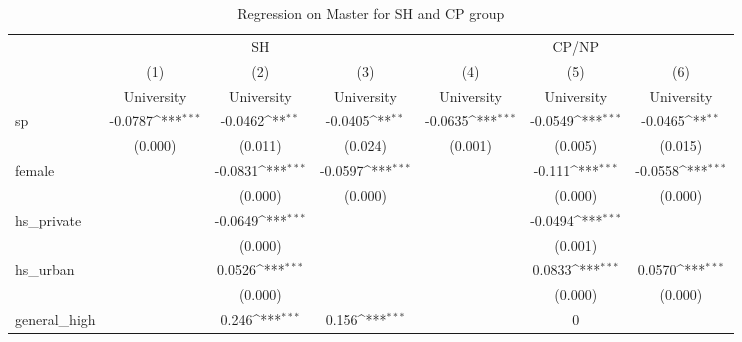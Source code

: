 \documentclass[]{AEA}
\def\sym#1{\ifmmode^{#1}\else\(^{#1}\)\fi}
\begin{document}
    \begin{center}
    \begin{table}
    \caption{Regression on Master for SH and CP group}
    \setlength{\tabcolsep}{0.5mm}
    \begin{tabular}{l*{6}c}
    \toprule
    &\multicolumn{3}{c}{SH} &\multicolumn{3}{c}{CP/NP} \\
    \cmidrule(l){2-4}\cmidrule(l){5-7}
    &\multicolumn{1}{c}{(1)}&\multicolumn{1}{c}{(2)}&\multicolumn{1}{c}{(3)}&\multicolumn{1}{c}{(4)}&\multicolumn{1}{c}{(5)}&\multicolumn{1}{c}{(6)} \\
    &\multicolumn{1}{c}{University}&\multicolumn{1}{c}{University}&\multicolumn{1}{c}{University}&\multicolumn{1}{c}{University}&\multicolumn{1}{c}{University}&\multicolumn{1}{c}{University} \\
    \midrule
    sp          &     -0.0787\sym{***}&     -0.0462\sym{**} &     -0.0405\sym{**} &     -0.0635\sym{***}&     -0.0549\sym{***}&     -0.0465\sym{**} \\
            &     (0.000)         &     (0.011)         &     (0.024)         &     (0.001)         &     (0.005)         &     (0.015)         \\
    [1em]
    female      &                     &     -0.0831\sym{***}&     -0.0597\sym{***}&                     &      -0.111\sym{***}&     -0.0558\sym{***}\\
                &                     &     (0.000)         &     (0.000)         &                     &     (0.000)         &     (0.000)         \\
    [1em]
    hs\_private  &                     &     -0.0649\sym{***}&                     &                     &     -0.0494\sym{***}&                     \\
                &                     &     (0.000)         &                     &                     &     (0.001)         &                     \\
    [1em]
    hs\_urban    &                     &      0.0526\sym{***}&                     &                     &      0.0833\sym{***}&      0.0570\sym{***}\\
                &                     &     (0.000)         &                     &                     &     (0.000)         &     (0.000)         \\
    [1em]
    general\_high&                     &       0.246\sym{***}&       0.156\sym{***}&                     &           0         &                     \\

\end{tabular}
\end{table}
\end{center}
\end{document}
